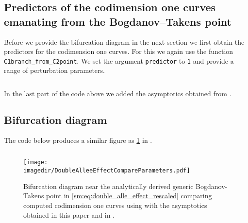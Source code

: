 \subsection{Predictors of the codimension one curves emanating from the Bogdanov--Takens point}
Before we provide the bifurcation diagram in the next section we first obtain
the predictors for the codimension one curves. For this we again use the
function \texttt{C1branch_from_C2point}. We set the argument
\texttt{predictor} to \texttt{1} and provide a range of
perturbation parameters.
\inputminted[firstline=118, lastline=137]{MATLAB}{\pathToDDEBifToolDemos/predator_prey/predator_prey.m}
In the last part of the code above we added the asymptotics obtained from \cite{Jiao2021}.

\subsection{Bifurcation diagram}
The code below produces a similar figure as \cref{sm:fig:DoubleAlleeEffectCompareParameters} in \MATLAB.
\inputminted[firstline=139, lastline=164]{MATLAB}{\pathToDDEBifToolDemos/predator_prey/predator_prey.m}
%
\begin{figure}[ht]
    \centering
    \texttt{[image: \\imagedir/DoubleAlleeEffectCompareParameters.pdf]}
    \caption{Bifurcation diagram near the analytically derived generic Bogdanov-Takens point in
        \cref{sm:eq:double_alle_effect_rescaled} comparing computed codimension one
        curves using \DDEBIFTOOL with the asymptotics obtained in this paper and in \cite{Jiao2021}.}
    \label{sm:fig:DoubleAlleeEffectCompareParameters}
\end{figure}

